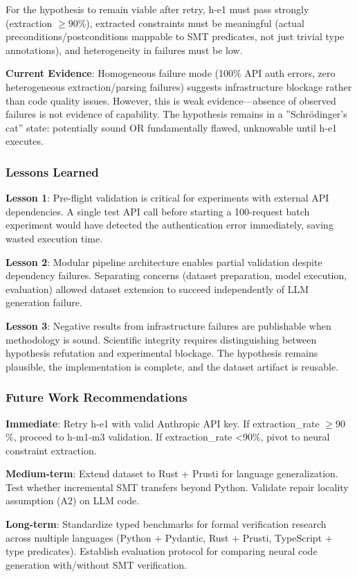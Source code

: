 For the hypothesis to remain viable after retry, h-e1 must pass strongly (extraction $\geq 90$\%), extracted constraints must be meaningful (actual preconditions/postconditions mappable to SMT predicates, not just trivial type annotations), and heterogeneity in failures must be low.

\textbf{Current Evidence}: Homogeneous failure mode (100\% API auth errors, zero heterogeneous extraction/parsing failures) suggests infrastructure blockage rather than code quality issues. However, this is weak evidence---absence of observed failures is not evidence of capability. The hypothesis remains in a ''Schrödinger's cat'' state: potentially sound OR fundamentally flawed, unknowable until h-e1 executes.

\subsubsection{Lessons Learned}

\textbf{Lesson 1}: Pre-flight validation is critical for experiments with external API dependencies. A single test API call before starting a 100-request batch experiment would have detected the authentication error immediately, saving wasted execution time.

\textbf{Lesson 2}: Modular pipeline architecture enables partial validation despite dependency failures. Separating concerns (dataset preparation, model execution, evaluation) allowed dataset extension to succeed independently of LLM generation failure.

\textbf{Lesson 3}: Negative results from infrastructure failures are publishable when methodology is sound. Scientific integrity requires distinguishing between hypothesis refutation and experimental blockage. The hypothesis remains plausible, the implementation is complete, and the dataset artifact is reusable.

\subsubsection{Future Work Recommendations}

\textbf{Immediate}: Retry h-e1 with valid Anthropic API key. If extraction\_rate $\geq 90$\%, proceed to h-m1-m3 validation. If extraction\_rate <90\%, pivot to neural constraint extraction.

\textbf{Medium-term}: Extend dataset to Rust + Prusti for language generalization. Test whether incremental SMT transfers beyond Python. Validate repair locality assumption (A2) on LLM code.

\textbf{Long-term}: Standardize typed benchmarks for formal verification research across multiple languages (Python + Pydantic, Rust + Prusti, TypeScript + type predicates). Establish evaluation protocol for comparing neural code generation with/without SMT verification.
